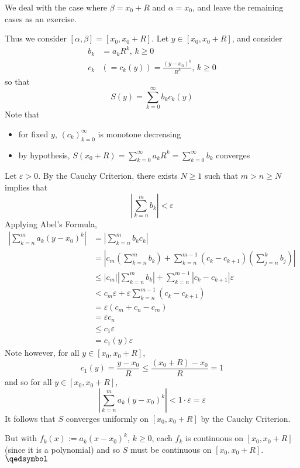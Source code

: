 \documentclass[11pt]{article}
\theoremstyle{definition}
\begin{document}
We deal with the case where $\beta = x_0 + R$ and $\alpha = x_0$, and leave the remaining cases as an exercise.

Thus we consider $[\alpha, \beta] = [x_0, x_0 + R]$. Let $y \in [x_0, x_0 + R]$, and consider
\begin{align*}
b_k & = a_kR^k, \, k \geq 0 \\
c_k & \left(= c_k(y) \right) = \frac{(y - x_0)^k}{R^k}, \, k \geq 0
\end{align*}
so that
$$S(y) = \sum_{k=0}^\infty b_k c_k(y)$$
Note that
\begin{itemize} \vspace{-0.2cm}
\item for fixed $y$, $(c_k)_{k=0}^\infty$ is monotone decreasing
\item by hypothesis, $S(x_0 + R) = \sum_{k=0}^\infty a_kR^k = \sum_{k=0}^\infty b_k$ converges
\end{itemize}
Let $\varepsilon > 0$. By the Cauchy Criterion, there exists $N \geq 1$ such that $m > n \geq N$ implies that
$$\left| \sum_{k=n}^m b_k \right| < \varepsilon$$
Applying Abel's Formula,
\begin{align*}
\left| \sum_{k=n}^m a_k(y - x_0)^k \right| 
& = \left| \sum_{k=n}^m b_k c_k \right| \\
& = \left| c_m \left(\sum_{k=n}^m b_k\right) + \sum_{k=n}^{m-1} (c_k - c_{k+1}) \left(\sum_{j=n}^k b_j\right) \right| \\
& \leq |c_m| \left|\sum_{k=n}^m b_k\right| + \sum_{k=n}^{m-1} |c_k - c_{k+1}| \varepsilon \\
& < c_m\varepsilon + \varepsilon \sum_{k=n}^{m-1} (c_k - c_{k+1}) \\
& = \varepsilon(c_m + c_n - c_m) \\
& = \varepsilon c_n \\
& \leq c_1 \varepsilon \\
& = c_1(y) \varepsilon
\end{align*}
Note however, for all $y \in [x_0, x_0 + R]$, 
$$c_1(y) = \frac{y - x_0}R \leq \frac{(x_0 + R) - x_0}R = 1$$
and so for all $y \in [x_0, x_0 + R]$, 
$$\left| \sum_{k=n}^m a_k (y - x_0)^k \right| < 1 \cdot \varepsilon = \varepsilon$$
It follows that $S$ converges uniformly on $[x_0, x_0 + R]$ by the Cauchy Criterion.

But with $f_k(x) := a_k(x - x_0)^k$, $k \geq 0$, each $f_k$ is continuous on $[x_0, x_0 + R]$ (since it is a polynomial) and so $S$ must be continuous on $[x_0, x_0 + R]$. $\qedsymbol$
\end{document}
